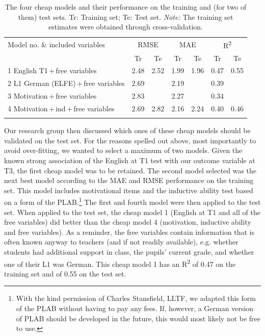 \documentclass[output=paper]{langsci/langscibook}
\begin{document}
\begin{table}
\caption{The four cheap models and their performance on the training and (for two of them) test sets. Tr: Training set; Te: Test set. \emph{Note:} The training set estimates were obtained through cross-validation.\label{tab:04:3}}
\begin{tabular}{l cc cc cc}
\lsptoprule
 Model no. \& included variables & \multicolumn{2}{c}{RMSE} & \multicolumn{2}{c}{MAE} & \multicolumn{2}{c}{R\textsuperscript{2}}\\\cmidrule(lr){2-3}\cmidrule(lr){4-5}\cmidrule(lr){6-7}
                             &  Tr & Te &  Tr & Te &  Tr & Te\\\midrule
1 English T1\,+\,free variables & 2.48 & 2.52 & 1.99 & 1.96 & 0.47 & 0.55\\
2 L1 German (ELFE)\,+\,free variables & 2.69 &  & 2.19 &  & 0.39 & \\
3 Motivation\,+\,free variables & 2.83 &  & 2.27 &  & 0.34 & \\
4 Motivation\,+\,ind\,+\,free variables & 2.69 & 2.82 & 2.16 & 2.24 & 0.40 & 0.46\\
\lspbottomrule
\end{tabular}
\textup{}
\end{table}


Our research group then discussed which ones of these cheap models should be validated on the test set. For the reasons spelled out above, most importantly to avoid over-fitting, we wanted to select a maximum of two models. Given the known strong association of the English at T1 test with our outcome variable at T3, the first cheap model was to be retained. The second model selected was the next best model according to the MAE and RMSE performance on the training set. This model includes motivational items and the inductive ability test based on a form of the PLAB.\footnote{With the kind permission of Charles Stansfield, LLTF, we adapted this form of the PLAB without having to pay any fees. If, however, a German version of PLAB should be developed in the future, this would most likely not be free to use.} The first and fourth model were then applied to the test set. When applied to the test set, the cheap model 1 (English at T1 and all of the free variables) did better than the cheap model 4 (motivation, inductive ability and free variables). As a reminder, the free variables contain information that is often known anyway to teachers (and if not readily available), e.g. whether students had additional support in class, the pupils’ current grade, and whether one of their L1 was German. This cheap model 1 has an R\textsuperscript{2} of 0.47 on the training set and of 0.55 on the test set. 
\end{document}
